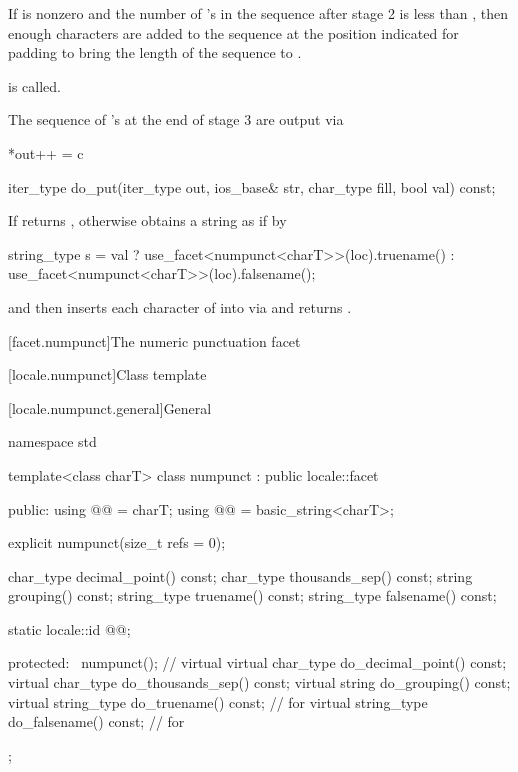 \begin{itemdescr}
\begin{description}
If  is nonzero and the number of 's
in the sequence after stage 2 is less than ,
then enough  characters are added to the sequence
at the position indicated for padding
to bring the length of the sequence to .

 is called.

The sequence of 's at the end of stage 3 are output via
\begin{codeblock}
*out++ = c
\end{codeblock}
\end{description}
\end{itemdescr}

%
\begin{itemdecl}
iter_type do_put(iter_type out, ios_base& str, char_type fill, bool val) const;
\end{itemdecl}

\begin{itemdescr}
\pnum
\returns
If 
returns ,
otherwise obtains a string  as if by
\begin{codeblock}
string_type s =
  val ? use_facet<numpunct<charT>>(loc).truename()
      : use_facet<numpunct<charT>>(loc).falsename();
\end{codeblock}
and then inserts each character  of  into 
via 
and returns .
\end{itemdescr}

[facet.numpunct]{The numeric punctuation facet}

[locale.numpunct]{Class template }

[locale.numpunct.general]{General}

%
\begin{codeblock}
namespace std {
  template<class charT>
  class numpunct : public locale::facet {
  public:
    using @@   = charT;
    using @@ = basic_string<charT>;

    explicit numpunct(size_t refs = 0);

    char_type   decimal_point() const;
    char_type   thousands_sep() const;
    string      grouping()      const;
    string_type truename()      const;
    string_type falsename()     const;

    static locale::id @@;

  protected:
    ~numpunct();                                                // virtual
    virtual char_type   do_decimal_point() const;
    virtual char_type   do_thousands_sep() const;
    virtual string      do_grouping()      const;
    virtual string_type do_truename()      const;               // for 
    virtual string_type do_falsename()     const;               // for 
  };
}
\end{codeblock}

